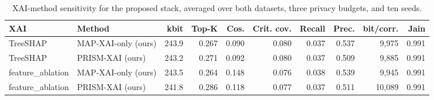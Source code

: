 \begin{table}[htbp]\centering\small
\caption{XAI-method sensitivity for the proposed stack, averaged over both datasets, three privacy budgets, and ten seeds.}
\label{tab:xai-scorecard}
\begin{tabular}{llrrrrrrrr}
\toprule
XAI & Method & kbit & Top-K & Cos. & Crit. cov. & Recall & Prec. & bit/corr. & Jain \\
\midrule
TreeSHAP & MAP-XAI-only (ours) & 243.9 & 0.267 & 0.090 & 0.080 & 0.037 & 0.537 & 9,975 & 0.991 \\
TreeSHAP & PRISM-XAI (ours) & 243.2 & 0.271 & 0.092 & 0.080 & 0.037 & 0.509 & 9,885 & 0.991 \\
feature\_ablation & MAP-XAI-only (ours) & 243.5 & 0.264 & 0.148 & 0.076 & 0.038 & 0.539 & 9,945 & 0.991 \\
feature\_ablation & PRISM-XAI (ours) & 241.8 & 0.286 & 0.118 & 0.077 & 0.037 & 0.511 & 10,089 & 0.991 \\
\bottomrule
\end{tabular}
\end{table}